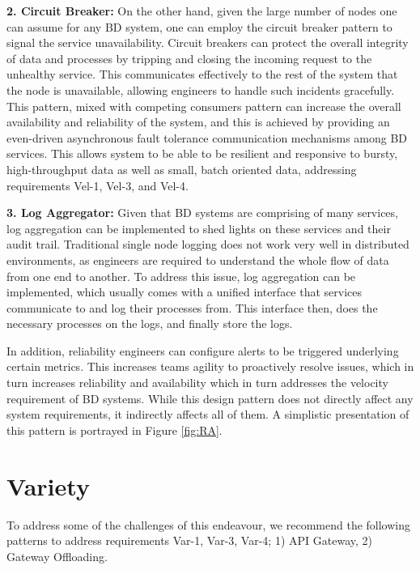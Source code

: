 \documentclass[a4paper,11pt,article,oneside]{memoir}
\begin{document}
\vspace{6px}
\textbf{2. Circuit Breaker:} On the other hand, given the large number of nodes one can assume for any BD system, one can employ the circuit breaker pattern to signal the service unavailability. Circuit breakers can protect the overall integrity of data and processes by tripping and closing the incoming request to the unhealthy service. This communicates effectively to the rest of the system that the node is unavailable, allowing engineers to handle such incidents gracefully. This pattern, mixed with competing consumers pattern can increase the overall availability and reliability of the system, and this is achieved by providing an even-driven asynchronous fault tolerance communication mechanisms among BD services. This allows system to be able to be resilient and responsive to bursty, high-throughput data as well as small, batch oriented data, addressing requirements Vel-1, Vel-3, and Vel-4. 
    
\vspace{6px}
\textbf{3. Log Aggregator:} Given that BD systems are comprising of many services, log aggregation can be implemented to shed lights on these services and their audit trail. Traditional single node logging does not work very well in distributed environments, as engineers are required to understand the whole flow of data from one end to another. To address this issue, log aggregation can be implemented, which usually comes with a unified interface that services communicate to and log their processes from. This interface then, does the necessary processes on the logs, and finally store the logs. 

In addition, reliability engineers can configure alerts to be triggered underlying certain metrics. This increases teams agility to proactively resolve issues, which in turn increases reliability and availability which in turn addresses the velocity requirement of BD systems. While this design pattern does not directly affect any system requirements, it indirectly affects all of them. A simplistic presentation of this pattern is portrayed in Figure \ref{fig:RA}. 




\section{Variety}
To address some of the challenges of this endeavour, we recommend the following patterns to address requirements Var-1, Var-3, Var-4; 1) API Gateway, 2) Gateway Offloading.
\end{document}
